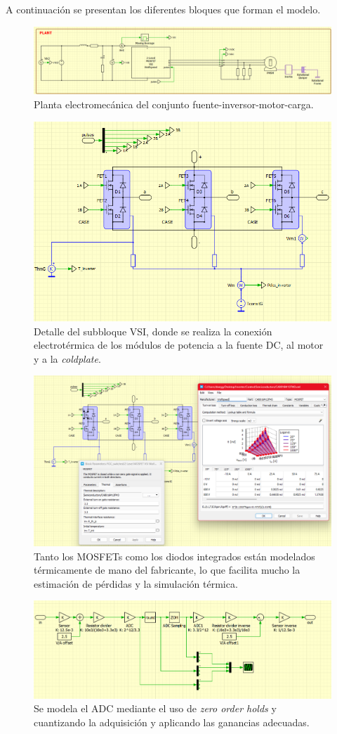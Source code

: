 A continuación se presentan los diferentes bloques que forman el modelo.
\begin{figure}[H]
	\centering
	\includegraphics[width=0.7\linewidth]{fig/PLECS_plant}
	\caption{Planta electromecánica del conjunto fuente-inversor-motor-carga.}
\end{figure}

\begin{figure}[H]
	\centering
	\includegraphics[width=0.7\linewidth]{fig/PLECS_mosfets}
	\caption{Detalle del subbloque VSI, donde se realiza la conexión electrotérmica de los módulos de potencia a la fuente DC, al motor y a la \textit{coldplate}.}
\end{figure}
\begin{figure}[H]
	\centering
	\includegraphics[width=0.7\linewidth]{fig/PLECS_MOSFETs-thermal}
	\caption{Tanto los MOSFETs como los diodos integrados están modelados térmicamente de mano del fabricante, lo que facilita mucho la estimación de pérdidas y la simulación térmica.}
\end{figure}
\begin{figure}[H]
	\centering
	\includegraphics[width=0.7\linewidth]{fig/PLECS_acq}
	\caption{Se modela el ADC mediante el uso de \textit{zero order holds} y cuantizando la adquisición y aplicando las ganancias adecuadas.}
\end{figure}
